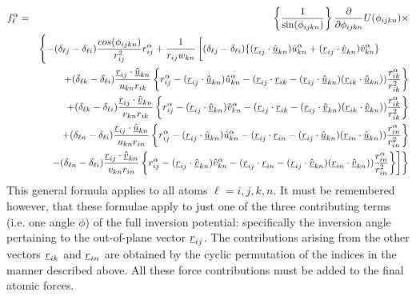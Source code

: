 \begin{eqnarray}
f_{\ell}^{\alpha} &=&
\left\{\frac{1}{\sin(\phi_{ijkn})}\right\}
\frac{\partial}{\partial \phi_{ijkn}}U(\phi_{ijkn})\times \\
& &
\left\{-(\delta_{\ell j}-\delta_{\ell i})\frac{cos(\phi_{ijkn})}
{r_{ij}^{2}}r_{ij}^{\alpha} +\frac{1}{r_{ij}w_{kn}}\left [
(\delta_{\ell j}-\delta_{\ell i}) 
\{(\vek{r}_{ij}\cdot\vek{\hat{u}}_{kn})\hat{u}_{kn}^{\alpha}+
(\vek{r}_{ij}\cdot\vek{\hat{v}}_{kn})\hat{v}_{kn}^{\alpha}\} 
\phantom{\left\{\frac{a_{a}^{a}}{a_{a}^{a}}\right\}}
\right. \right. \nonumber \\
& & + (\delta_{\ell k}-\delta_{\ell i})
\frac{\vek{r}_{ij}\cdot\vek{\hat{u}}_{kn}}{u_{kn}r_{ik}}\left \{
r_{ij}^{\alpha}-(\vek{r}_{ij}\cdot\vek{\hat{u}}_{kn})\hat{u}_{kn}^{\alpha}
-(\vek{r}_{ij}\cdot\vek{r}_{ik}-(\vek{r}_{ij}\cdot\vek{\hat{u}}_{kn})
(\vek{r}_{ik}\cdot\vek{\hat{u}}_{kn}))\frac{r_{ik}^{\alpha}}{r_{ik}^{2}}
\right \} \nonumber \\
& & + (\delta_{\ell k}-\delta_{\ell i})
\frac{\vek{r}_{ij}\cdot\vek{\hat{v}}_{kn}}{v_{kn}r_{ik}}\left \{
r_{ij}^{\alpha}-(\vek{r}_{ij}\cdot\vek{\hat{v}}_{kn})\hat{v}_{kn}^{\alpha}
-(\vek{r}_{ij}\cdot\vek{r}_{ik}-(\vek{r}_{ij}\cdot\vek{\hat{v}}_{kn})
(\vek{r}_{ik}\cdot\vek{\hat{v}}_{kn}))\frac{r_{ik}^{\alpha}}{r_{ik}^{2}}
\right \} \nonumber \\
& &+ (\delta_{\ell n}-\delta_{\ell i})
\frac{\vek{r}_{ij}\cdot\vek{\hat{u}}_{kn}}{u_{kn}r_{in}}\left \{
r_{ij}^{\alpha}-(\vek{r}_{ij}\cdot\vek{\hat{u}}_{kn})\hat{u}_{kn}^{\alpha}
-(\vek{r}_{ij}\cdot\vek{r}_{in}-(\vek{r}_{ij}\cdot\vek{\hat{u}}_{kn})
(\vek{r}_{in}\cdot\vek{\hat{u}}_{kn}))\frac{r_{in}^{\alpha}}{r_{in}^{2}}
\right \} \nonumber \\
& & \left . \left .- (\delta_{\ell n}-\delta_{\ell i})
\frac{\vek{r}_{ij}\cdot\vek{\hat{v}}_{kn}}{v_{kn}r_{in}}\left \{
r_{ij}^{\alpha}-(\vek{r}_{ij}\cdot\vek{\hat{v}}_{kn})\hat{v}_{kn}^{\alpha}
-(\vek{r}_{ij}\cdot\vek{r}_{in}-(\vek{r}_{ij}\cdot\vek{\hat{v}}_{kn})
(\vek{r}_{in}\cdot\vek{\hat{v}}_{kn}))\frac{r_{in}^{\alpha}}{r_{in}^{2}}
\right \} \right ] \right \} \nonumber 
\end{eqnarray}
This general formula applies to all atoms $\ell=i,j,k,n$. It must be
remembered however, that these formulae apply to just
one of the three contributing terms (i.e. one angle $\phi$) of the
full inversion potential: specifically the inversion angle pertaining
to the out-of-plane vector $\mbox{$\underline{r}$}_{ij}$. The contributions arising
from the other vectors $\mbox{$\underline{r}$}_{ik}$ and $\mbox{$\underline{r}$}_{in}$ are obtained
by the cyclic permutation of the indices in the manner described
above.  All these force contributions must be added to the final
atomic forces.

